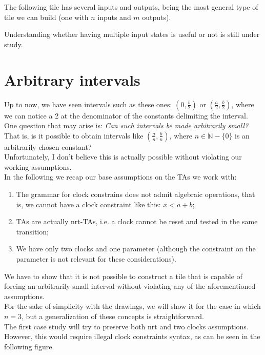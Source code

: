 \documentclass[12pt, a4paper]{article}
\begin{document}
\noindent
The following tile has several inputs and outputs, being the most general type of tile we can build (one with $n$ inputs and $m$ outputs).



\noindent
Understanding whether having multiple input states is useful or not is still under study.

\newpage

\section{Arbitrary intervals}

\noindent
Up to now, we have seen intervals such as these ones: $(0, \frac{b}{2})$ or $(\frac{a}{2}, \frac{b}{2})$, where we can notice a 2 at the denominator of the constants delimiting the interval.\\
One question that may arise is: \emph{Can such intervals be made arbitrarily small?} That is, is it possible to obtain intervals like $(\frac{a}{n}, \frac{b}{n})$, where $n \in \mathbb{N}-\{0\}$ is an arbitrarily-chosen constant?\\
Unfortunately, I don't believe this is actually possible without violating our working assumptions.\\

\noindent
In the following we recap our base assumptions on the TAs we work with:
\begin{enumerate}
\item The grammar for clock constrains does not admit algebraic operations, that is, we cannot have a clock constraint like this: $x < a + b$;
\item TAs are actually nrt-TAs, i.e. a clock cannot be reset and tested in the same transition;
\item We have only two clocks and one parameter (although the constraint on the parameter is not relevant for these considerations).
\end{enumerate}

\noindent
We have to show that it is not possible to construct a tile that is capable of forcing an arbitrarily small interval without violating any of the aforementioned assumptions.\\
For the sake of simplicity with the drawings, we will show it for the case in which $n = 3$, but a generalization of these concepts is straightforward.\\

\noindent
The first case study will try to preserve both nrt and two clocks assumptions. However, this would require illegal clock constraints syntax, as can be seen in the following figure.\\
\end{document}
